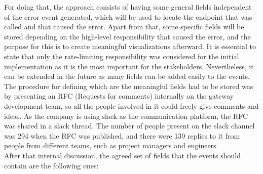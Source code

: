 \documentclass[english, 12pt, a4paper, sci, utf8, a-1b, online]{aaltothesis}
\begin{document}
For doing that, the approach consists of having some general fields independent of the error event generated, which will be used to locate the endpoint that was called and that caused the error. Apart from that, some specific fields will be stored depending on the high-level responsibility that caused the error, and the purpose for this is to create meaningful visualizations afterward. It is essential to state that only the rate-limiting responsibility was considered for the initial implementation as it is the most important for the stakeholders. Nevertheless, it can be extended in the future as many fields can be added easily to the events.\\

The procedure for defining which are the meaningful fields had to be stored was by presenting an RFC (Requests for comments) \cite{reynolds1987request} internally on the gateway development team, so all the people involved in it could freely give comments and ideas. As the company is using slack as the communication platform, the RFC was shared in a slack thread. The number of people present on the slack channel was 294 when the RFC was published, and there were 139 replies to it from people from different teams, such as project managers and engineers.\\

After that internal discussion, the agreed set of fields that the events should contain are the following ones:
\end{document}
